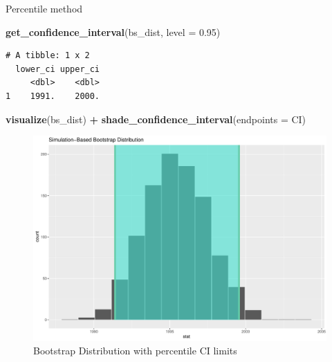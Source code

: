 \documentclass[
  ignorenonframetext,
]{beamer}
\newenvironment{Shaded}{\begin{snugshade}}{\end{snugshade}}
\newcommand{\AttributeTok}[1]{\textcolor[rgb]{0.13,0.29,0.53}{#1}}
\newcommand{\FloatTok}[1]{\textcolor[rgb]{0.00,0.00,0.81}{#1}}
\newcommand{\FunctionTok}[1]{\textcolor[rgb]{0.13,0.29,0.53}{\textbf{#1}}}
\newcommand{\NormalTok}[1]{#1}
\newcommand{\SpecialCharTok}[1]{\textcolor[rgb]{0.81,0.36,0.00}{\textbf{#1}}}
\begin{document}
\begin{frame}[fragile]{Percentile method}
\protect\hypertarget{percentile-method-1}{}
\small

\begin{Shaded}
\begin{Highlighting}[]
\FunctionTok{get\_confidence\_interval}\NormalTok{(bs\_dist, }\AttributeTok{level =} \FloatTok{0.95}\NormalTok{)}
\end{Highlighting}
\end{Shaded}

\begin{verbatim}
# A tibble: 1 x 2
  lower_ci upper_ci
     <dbl>    <dbl>
1    1991.    2000.
\end{verbatim}

\begin{Shaded}
\begin{Highlighting}[]
\FunctionTok{visualize}\NormalTok{(bs\_dist) }\SpecialCharTok{+} 
  \FunctionTok{shade\_confidence\_interval}\NormalTok{(}\AttributeTok{endpoints =}\NormalTok{ CI)}
\end{Highlighting}
\end{Shaded}

\begin{figure}

{\centering \includegraphics[width=0.5\linewidth,height=0.4\textheight]{Week10_Lect_files/figure-beamer/bsci-1} 

}

\caption{Bootstrap Distribution with percentile CI limits}\label{fig:bsci}
\end{figure}
\normalsize
\end{frame}
\end{document}
